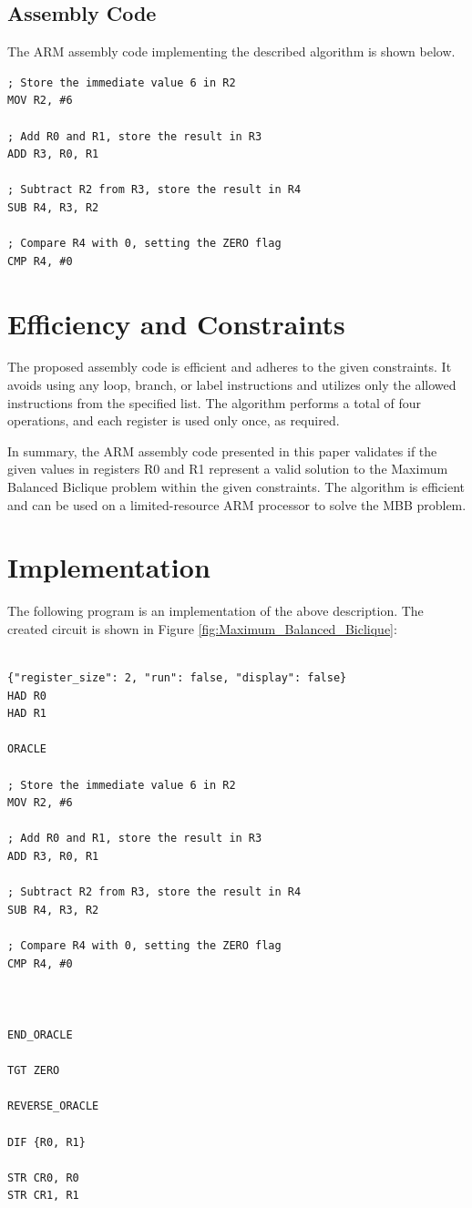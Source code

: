 \subsection{Assembly Code}

The ARM assembly code implementing the described algorithm is shown below.

\begin{verbatim}
; Store the immediate value 6 in R2
MOV R2, #6

; Add R0 and R1, store the result in R3
ADD R3, R0, R1

; Subtract R2 from R3, store the result in R4
SUB R4, R3, R2

; Compare R4 with 0, setting the ZERO flag
CMP R4, #0
\end{verbatim}

\section{Efficiency and Constraints}

The proposed assembly code is efficient and adheres to the given constraints. It avoids using any loop, branch, or label instructions and utilizes only the allowed instructions from the specified list. The algorithm performs a total of four operations, and each register is used only once, as required.

In summary, the ARM assembly code presented in this paper validates if the given values in registers R0 and R1 represent a valid solution to the Maximum Balanced Biclique problem within the given constraints. The algorithm is efficient and can be used on a limited-resource ARM processor to solve the MBB problem.



\section{Implementation}

The following program is an implementation of the above description. The created circuit is shown in Figure \ref{fig:Maximum_Balanced_Biclique}:

\begin{lstlisting}

{"register_size": 2, "run": false, "display": false}
HAD R0
HAD R1

ORACLE

; Store the immediate value 6 in R2
MOV R2, #6

; Add R0 and R1, store the result in R3
ADD R3, R0, R1

; Subtract R2 from R3, store the result in R4
SUB R4, R3, R2

; Compare R4 with 0, setting the ZERO flag
CMP R4, #0



END_ORACLE

TGT ZERO

REVERSE_ORACLE

DIF {R0, R1}

STR CR0, R0
STR CR1, R1


\end{lstlisting}

